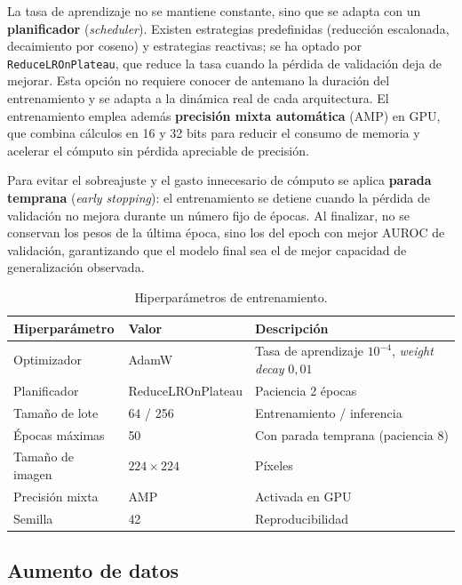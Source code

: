 La tasa de aprendizaje no se mantiene constante, sino que se adapta con un
\textbf{planificador} (\textit{scheduler}). Existen estrategias predefinidas
(reducción escalonada, decaimiento por coseno) y estrategias reactivas; se ha
optado por \texttt{ReduceLROnPlateau}, que reduce la tasa cuando la pérdida de
validación deja de mejorar. Esta opción no requiere conocer de antemano la
duración del entrenamiento y se adapta a la dinámica real de cada arquitectura.
El entrenamiento emplea además \textbf{precisión mixta automática} (AMP) en GPU,
que combina cálculos en 16 y 32 bits para reducir el consumo de memoria y
acelerar el cómputo sin pérdida apreciable de precisión.

Para evitar el sobreajuste y el gasto innecesario de cómputo se aplica
\textbf{parada temprana} (\textit{early stopping}): el entrenamiento se detiene
cuando la pérdida de validación no mejora durante un número fijo de épocas. Al
finalizar, no se conservan los pesos de la última época, sino los del epoch con
mejor AUROC de validación, garantizando que el modelo final sea el de mejor
capacidad de generalización observada.

\begin{table}[h]
\centering
\begin{tabularx}{\textwidth}{l l X}
\toprule
\textbf{Hiperparámetro} & \textbf{Valor} & \textbf{Descripción} \\
\midrule
Optimizador & AdamW & Tasa de aprendizaje $10^{-4}$, \textit{weight decay} $0{,}01$ \\
Planificador & ReduceLROnPlateau & Paciencia 2 épocas \\
Tamaño de lote & 64 / 256 & Entrenamiento / inferencia \\
Épocas máximas & 50 & Con parada temprana (paciencia 8) \\
Tamaño de imagen & $224 \times 224$ & Píxeles \\
Precisión mixta & AMP & Activada en GPU \\
Semilla & 42 & Reproducibilidad \\
\bottomrule
\end{tabularx}
\caption{Hiperparámetros de entrenamiento.}
\label{tab::mm_hiperparametros}
\end{table}

\subsection{Aumento de datos}

